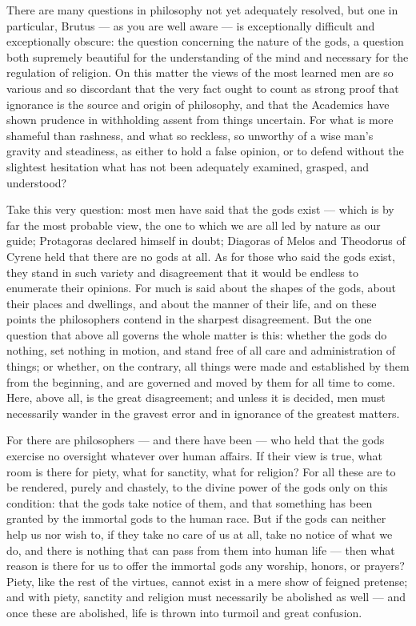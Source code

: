 

 There are many questions in philosophy not yet adequately resolved, but one in particular, Brutus — as you are well aware — is exceptionally difficult and exceptionally obscure: the question concerning the nature of the gods, a question both supremely beautiful for the understanding of the mind and necessary for the regulation of religion. On this matter the views of the most learned men are so various and so discordant that the very fact ought to count as strong proof that ignorance is the source and origin of philosophy, and that the Academics have shown prudence in withholding assent from things uncertain. For what is more shameful than rashness, and what so reckless, so unworthy of a wise man's gravity and steadiness, as either to hold a false opinion, or to defend without the slightest hesitation what has not been adequately examined, grasped, and understood?

 Take this very question: most men have said that the gods exist — which is by far the most probable view, the one to which we are all led by nature as our guide; Protagoras declared himself in doubt; Diagoras of Melos and Theodorus of Cyrene held that there are no gods at all. As for those who said the gods exist, they stand in such variety and disagreement that it would be endless to enumerate their opinions. For much is said about the shapes of the gods, about their places and dwellings, and about the manner of their life, and on these points the philosophers contend in the sharpest disagreement. But the one question that above all governs the whole matter is this: whether the gods do nothing, set nothing in motion, and stand free of all care and administration of things; or whether, on the contrary, all things were made and established by them from the beginning, and are governed and moved by them for all time to come. Here, above all, is the great disagreement; and unless it is decided, men must necessarily wander in the gravest error and in ignorance of the greatest matters.

 For there are philosophers — and there have been — who held that the gods exercise no oversight whatever over human affairs. If their view is true, what room is there for piety, what for sanctity, what for religion? For all these are to be rendered, purely and chastely, to the divine power of the gods only on this condition: that the gods take notice of them, and that something has been granted by the immortal gods to the human race. But if the gods can neither help us nor wish to, if they take no care of us at all, take no notice of what we do, and there is nothing that can pass from them into human life — then what reason is there for us to offer the immortal gods any worship, honors, or prayers? Piety, like the rest of the virtues, cannot exist in a mere show of feigned pretense; and with piety, sanctity and religion must necessarily be abolished as well — and once these are abolished, life is thrown into turmoil and great confusion.

